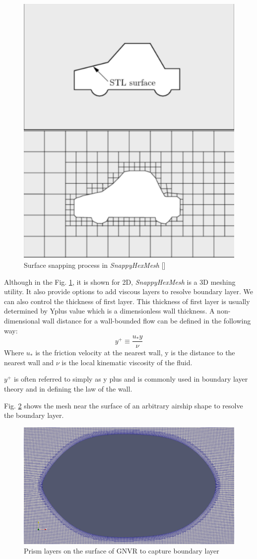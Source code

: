 \begin{figure}[H]
	\centering
	\includegraphics[width=180 pt]{mesh/snappyHexMesh.png}
	\caption{Surface snapping process in \textit{SnappyHexMesh} [] }
	\label{Snappy Hex Mesh} %
\end{figure} 

Although in the Fig. \ref{Snappy Hex Mesh}, it is shown for 2D, \textit{SnappyHexMesh} is a 3D meshing utility. It also provide options to add viscous layers to resolve boundary layer. We can also control the thickness of first layer. This thickness of first layer is usually determined by Yplus value which is a dimensionless wall thickness.
A non-dimensional wall distance for a wall-bounded flow can be defined in the following way:
\begin{equation}
y^{+} \equiv \dfrac{u_{*} y}{\nu}
\end{equation}
Where $ u_{*} $ is the friction velocity at the nearest wall, y is the distance to the nearest wall and $ \nu $ is the local kinematic viscosity of the fluid.

$ y^+ $ is often referred to simply as y plus and is commonly used in boundary layer theory and in defining the law of the wall.

Fig. \ref{prismlayers} shows the mesh near the surface of an arbitrary airship shape to resolve the boundary layer.
\begin{figure}[H]
	\centering
	\includegraphics[width=300 pt]{rnd/viscous_layers.png}
	\caption{Prism layers on the surface of GNVR to capture boundary layer}
	\label{prismlayers} %
\end{figure}

